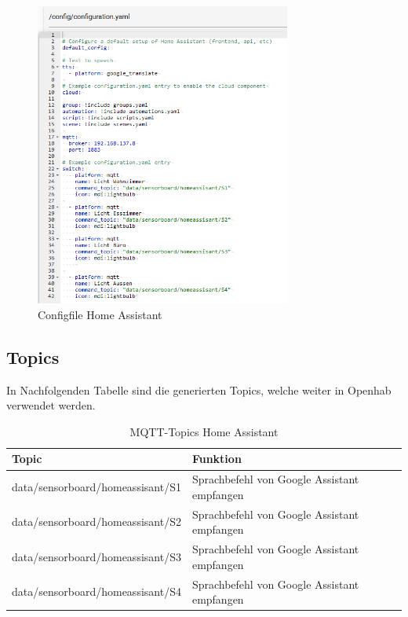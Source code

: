 \begin{enumerate}
\begin{figure}[H]
	\includegraphics[width=0.75\textwidth]{graphics/Homeassostantconfig.PNG}
	\caption{Configfile Home Assistant} 	
	\label{pic: Configfile Home Assistant}
\end{figure}


 
\end{enumerate}

\subsection{Topics}
In Nachfolgenden Tabelle sind die generierten Topics, welche weiter in Openhab verwendet werden.
\begin{table}[H]
	\centering
	\begin{tabular}{|l|l|}
		\hline 
		Topic  & Funktion  \\ 
		\hline 
	data/sensorboard/homeassisant/S1 & Sprachbefehl von Google Assistant empfangen  \\ 
		\hline
	data/sensorboard/homeassisant/S2 & Sprachbefehl von Google Assistant empfangen \\ 
		\hline
	data/sensorboard/homeassisant/S3 & Sprachbefehl von Google Assistant empfangen \\ 
		\hline
		data/sensorboard/homeassisant/S4 & Sprachbefehl von Google Assistant empfangen  \\ 
		\hline
	\end{tabular} 	
	\label{tab: MQTT-Topics Home Assistant}
	\caption{MQTT-Topics Home Assistant}
\end{table}